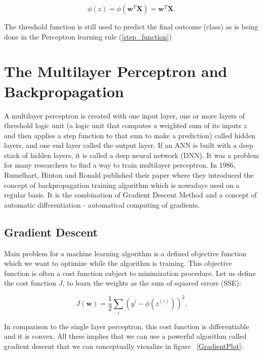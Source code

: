 \documentclass[a4paper,oneside,openright,11pt]{book}
\begin{document}
\begin{equation} 
    \phi(z) =  \phi(\textbf{w}^{T} \textbf{X}) = \textbf{w}^{T} \textbf{X}.
\end{equation}

The threshold function is still used to predict the final outcome (class)  as is being done in the Perceptron learning rule (\ref{step_function})

\section{The Multilayer Perceptron and Backpropagation}

A multilayer perceptron is created with one input layer, one or more layers of threshold logic unit (a logic unit that computes a weighted sum of its inputs $z$ and then applies a step function to that sum to make a prediction) called hidden layers, and one end layer called the output layer. If an ANN is built with a deep stack of hidden layers, it is called a deep neural network (DNN). It was a problem for many researchers to find a way to train multilayer perceptron. In 1986, Rumelhart, Hinton and Ronald published their paper \cite{rumelhart1985learning} where they introduced the concept of backpropagation training algorithm which is nowadays used on a regular basis. It is the combination of Gradient Descent Method and a concept of automatic differentiation - automatical computing of gradients.


\subsection{Gradient Descent}

Main problem for a machine learning algorithm is a defined objective function which we want to optimize while the algorithm is training. This objective function is often a cost function subject to minimization procedure. Let us define the cost function $J$, to learn the weights as the sum of squared errors (SSE):

\begin{equation}
    J(\textbf{w}) = \frac{1}{2}\sum_{i}^{}(y^{i} - \phi(z^{(i)}))^{2}.
\end{equation}

In comparison to the single layer perceptron, this cost function is differentiable and it is convex. All these implies that we can use a powerful algorithm called gradient descent that we can conceptually visualize in figure ~\ref{GradientPlot}:
\end{document}
